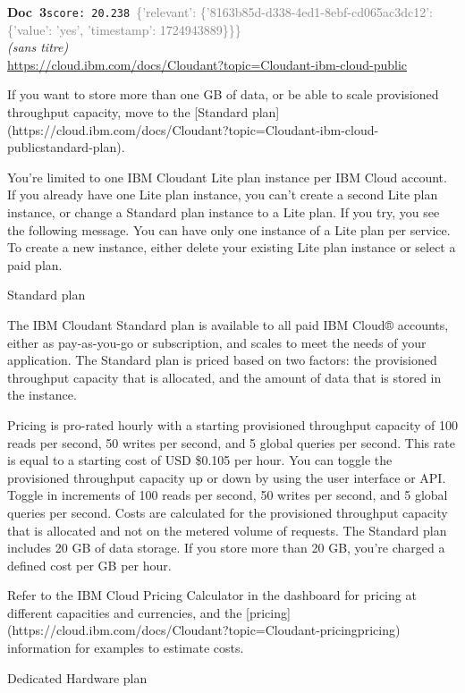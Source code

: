 \documentclass[a4paper,11pt]{article}
\begin{document}
\begin{docenv}
{\footnotesize\textcolor{doccolor}{\textbf{Doc~3}}}\hfill{\tiny\texttt{score:~20.238}}\ {\tiny\textcolor{gray}{\{'relevant': \{'8163b85d-d338-4ed1-8ebf-cd065ac3dc12': \{'value': 'yes', 'timestamp': 1724943889\}\}\}}}\\[3pt]
{\small\textit{(sans titre)}}\\[2pt]
{\tiny\url{https://cloud.ibm.com/docs/Cloudant?topic=Cloudant-ibm-cloud-public}}\\[4pt]
{\footnotesize 
If you want to store more than one GB of data, or be able to scale provisioned throughput capacity, move to the [Standard plan](https://cloud.ibm.com/docs/Cloudant?topic=Cloudant-ibm-cloud-publicstandard-plan).

You're limited to one IBM Cloudant Lite plan instance per IBM Cloud account. If you already have one Lite plan instance, you can't create a second Lite plan instance, or change a Standard plan instance to a Lite plan. If you try, you see the following message. You can have only one instance of a Lite plan per service. To create a new instance, either delete your existing Lite plan instance or select a paid plan.





 Standard plan 

The IBM Cloudant Standard plan is available to all paid IBM Cloud® accounts, either as pay-as-you-go or subscription, and scales to meet the needs of your application. The Standard plan is priced based on two factors: the provisioned throughput capacity that is allocated, and the amount of data that is stored in the instance.

Pricing is pro-rated hourly with a starting provisioned throughput capacity of 100 reads per second, 50 writes per second, and 5 global queries per second. This rate is equal to a starting cost of USD \$0.105 per hour. You can toggle the provisioned throughput capacity up or down by using the user interface or API. Toggle in increments of 100 reads per second, 50 writes per second, and 5 global queries per second. Costs are calculated for the provisioned throughput capacity that is allocated and not on the metered volume of requests. The Standard plan includes 20 GB of data storage. If you store more than 20 GB, you're charged a defined cost per GB per hour.

Refer to the IBM Cloud Pricing Calculator in the dashboard for pricing at different capacities and currencies, and the [pricing](https://cloud.ibm.com/docs/Cloudant?topic=Cloudant-pricingpricing) information for examples to estimate costs.





 Dedicated Hardware plan}
\end{docenv}
\end{document}
